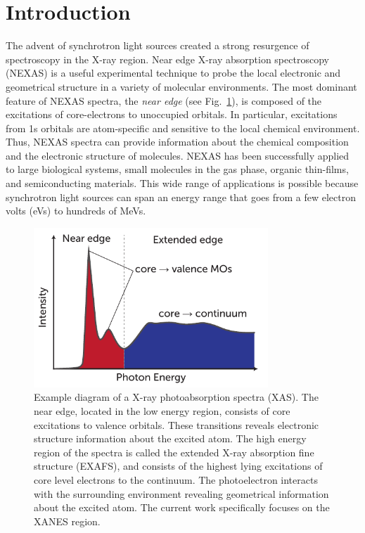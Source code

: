 \documentclass[12pt]{article}
\begin{document}
\section{Introduction}
The advent of synchrotron light sources created a strong resurgence of spectroscopy in the X-ray region. \cite{mcmillan_synchrotronproposed_1945} Near edge X-ray absorption spectroscopy (NEXAS) is a useful experimental technique to probe the local electronic and geometrical structure in a variety of molecular environments.
The most dominant feature of NEXAS spectra, the \textit{near edge}  (see Fig.~\ref{fig:nexas-illustration}), is composed of the excitations of core-electrons to unoccupied orbitals.
In particular, excitations from 1s orbitals are atom-specific and sensitive to the local chemical environment.
Thus, NEXAS spectra can provide information about the chemical composition and the electronic structure of molecules.
NEXAS has been successfully applied to large biological systems, \cite{hua_refinement_2010} small molecules in the gas phase,\cite{contini_gas-phase_2001} organic thin-films,\cite{hahner_near_2006} and semiconducting materials.\cite{guo_electronic_2011} This wide range of applications is possible because synchrotron light sources can span an energy range that goes from a few electron volts (eVs) \cite{feneberg_synchrotron-based_2011} to hundreds of MeVs.\cite{nakazato_observation_1989}

\begin{figure}
\centering
\includegraphics[width=8.8cm]{NEXASIllustration.pdf}
\caption{Example diagram of a X-ray photoabsorption spectra (XAS).  The near edge, located in the low energy region, consists of core excitations to valence orbitals.  These transitions reveals electronic structure information about the excited atom. The high energy region of the spectra is called the extended X-ray absorption fine structure (EXAFS), and consists of the highest lying excitations of core level electrons to the continuum. The photoelectron interacts with the surrounding environment revealing geometrical information about the excited atom. The current work specifically focuses on the XANES region.}
\label{fig:nexas-illustration}
\end{figure}
\end{document}
